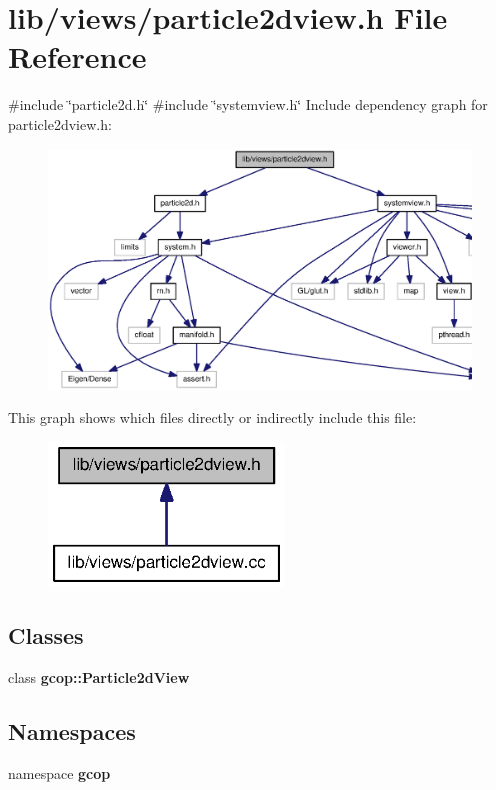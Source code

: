 \section{lib/views/particle2dview.h \-File \-Reference}
\label{particle2dview_8h}
{\ttfamily \#include \char`\"{}particle2d.\-h\char`\"{}}\*
{\ttfamily \#include \char`\"{}systemview.\-h\char`\"{}}\*
\-Include dependency graph for particle2dview.\-h\-:
\nopagebreak
\begin{figure}[H]
\begin{center}
\leavevmode
\includegraphics[width=350pt]{particle2dview_8h__incl}
\end{center}
\end{figure}
\-This graph shows which files directly or indirectly include this file\-:
\nopagebreak
\begin{figure}[H]
\begin{center}
\leavevmode
\includegraphics[width=178pt]{particle2dview_8h__dep__incl}
\end{center}
\end{figure}
\subsection*{\-Classes}
\begin{DoxyCompactItemize}
\item 
class {\bf gcop\-::\-Particle2d\-View}
\end{DoxyCompactItemize}
\subsection*{\-Namespaces}
\begin{DoxyCompactItemize}
\item 
namespace {\bf gcop}
\end{DoxyCompactItemize}
